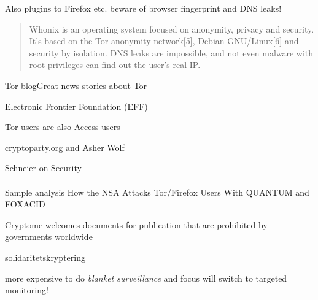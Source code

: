 \documentclass[20pt,landscape,a4paper,footrule]{foils}
\begin{document}

\centerline{Also plugins to Firefox etc. beware of browser fingerprint and DNS leaks!}



\begin{quote}
Whonix is an operating system focused on anonymity, privacy and security. It's based on the Tor anonymity network[5], Debian GNU/Linux[6] and security by isolation. DNS leaks are impossible, and not even malware with root privileges can find out the user's real IP.
\end{quote}



\begin{list2}
\item Tor blogGreat news stories about Tor\\
\item  Electronic Frontier Foundation (EFF) \\
\item Tor users are also Access users\\

\item cryptoparty.org and Asher Wolf\\
\item Schneier on Security\\
\\
Sample analysis How the NSA Attacks Tor/Firefox Users With QUANTUM and FOXACID\\
\item
Cryptome welcomes documents for publication that are prohibited by governments worldwide\\
\end{list2}



\centerline{solidaritetskryptering}

more expensive to do \emph{blanket surveillance} and focus will switch to targeted monitoring!
\end{document}
